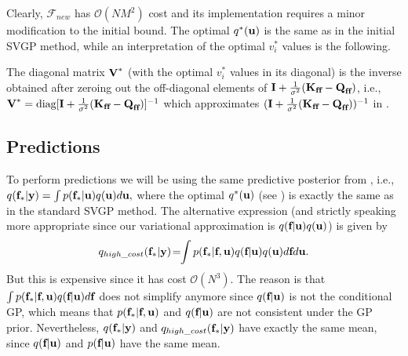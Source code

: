 Clearly, $\mathcal{F}_{new}$ has $\mathcal{O}(N M^2)$ cost and its implementation requires a minor modification to the initial bound. The optimal $q^*(\textbf{u})$
is the same as in the initial SVGP method, while 
an interpretation of the optimal $v_i^*$ values
is the following.  

\begin{remark}
The diagonal matrix $\textbf{V}^*$ (with the optimal $v_i^*$ values in its diagonal) is the inverse obtained after zeroing out the off-diagonal elements of $\textbf{I} + \frac{1}{\sigma^2}(\textbf{K}_{\textbf{f} \textbf{f}} - \textbf{Q}_{\textbf{f} \textbf{f}})$, 
i.e., $\textbf{V}^* = \text{diag}[\textbf{I} + \frac{1}{\sigma^2}(\textbf{K}_{\textbf{f} \textbf{f}} - \textbf{Q}_{\textbf{f} \textbf{f}})]^{-1}$ which approximates 
$(\textbf{I} + \frac{1}{\sigma^2}(\textbf{K}_{\textbf{f} \textbf{f}} - \textbf{Q}_{\textbf{f} \textbf{f}}))^{-1}$ 
in . %
\end{remark}


\subsection{Predictions
\label{sec:predictions}
} 

To perform 
predictions we will be using 
the same predictive posterior 
from , i.e., 
$
q(\textbf{f}_* | \textbf{y}) =
\int p(\textbf{f}_* | \textbf{u}) q(\textbf{u}) d \textbf{u}, 
$
where the optimal $q^*(\textbf{u})$ (see ) 
is exactly the same as in 
the standard SVGP method. The alternative expression (and strictly speaking more appropriate 
since our variational approximation is $q(\textbf{f} | \textbf{u}) q(\textbf{u})$) is given by 
\begin{equation}
q_{high\_cost}(\textbf{f}_* | \textbf{y}) 
\! = \! \! \int p(\textbf{f}_* | \textbf{f}, \textbf{u}) q(\textbf{f} |  \textbf{u}) q(\textbf{u})  d \textbf{f} d \textbf{u}. 
\end{equation}
But this is expensive since it has cost $\mathcal{O}(N^3)$. The reason is that $\int p(\textbf{f}_* | \textbf{f}, \textbf{u}) q(\textbf{f} |  \textbf{u}) d \textbf{f}$ does not simplify anymore since $q(\textbf{f} |  \textbf{u})$ 
is not the conditional GP, which 
means that $p(\textbf{f}_* | \textbf{f}, \textbf{u})$ and $q(\textbf{f} | \textbf{u})$ are not consistent 
under the GP prior. 
Nevertheless, 
$q(\textbf{f}_* | \textbf{y})$ and $q_{high\_cost}(\textbf{f}_* | \textbf{y})$ have exactly the same mean,  since $q(\textbf{f} | \textbf{u})$ and $p(\textbf{f} | \textbf{u})$ have the 
same mean.

